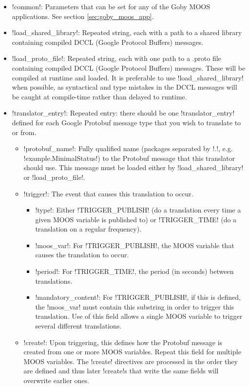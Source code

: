 \begin{itemize}
\item !common!: Parameters that can be set for any of the Goby MOOS applications. See section \ref{sec:goby_moos_app}.
\item !load_shared_library!: Repeated string, each with a path to a shared library containing compiled DCCL (Google Protocol Buffers) messages.
\item !load_proto_file!: Repeated string, each with one path to a .proto file containing compiled DCCL (Google Protocol Buffers) messages. These will be compiled at runtime and loaded. It is preferable to use !load_shared_library! when possible, as syntactical and type mistakes in the DCCL messages will be caught at compile-time rather than delayed to runtime.
\item !translator_entry!: Repeated entry: there should be one !translator_entry! defined for each Google Protobuf message type that you wish to translate to or from.
\begin{itemize}
\item !protobuf_name!: Fully qualified name (packages separated by !.!, e.g. !example.MinimalStatus!) to the Protobuf message that this translator should use. This message must be loaded either by !load_shared_library! or !load_proto_file!. 
\item !trigger!: The event that causes this translation to occur.
\begin{itemize}
\item !type!: Either !TRIGGER_PUBLISH! (do a translation every time a given MOOS variable is published to) or !TRIGGER_TIME! (do a translation on a regular frequency).
\item !moos_var!: For !TRIGGER_PUBLISH!, the MOOS variable that causes the translation to occur.
\item !period!: For !TRIGGER_TIME!, the period (in seconds) between translations.
\item !mandatory_content!: For !TRIGGER_PUBLISH!, if this is defined, the !moos_var! must contain this substring in order to trigger this translation. Use of this field allows a single MOOS variable to trigger several different translations.
\end{itemize}
\item !create!: Upon triggering, this defines how the Protobuf message is created from one or more MOOS variables. Repeat this field for multiple MOOS variables. The !create! directives are processed in the order they are defined and thus later !create!s that write the same fields will overwrite earlier ones.

\end{itemize}
\end{itemize}
